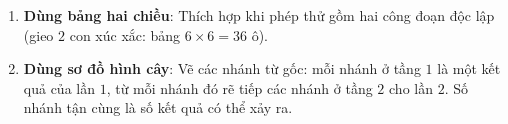\begin{enumerate}
\item \textbf{Dùng bảng hai chiều}: Thích hợp khi phép thử gồm hai công đoạn độc lập (gieo $2$ con xúc xắc: bảng $6 \times 6 = 36$ ô).
\item \textbf{Dùng sơ đồ hình cây}: Vẽ các nhánh từ gốc: mỗi nhánh ở tầng $1$ là một kết quả của lần $1$, từ mỗi nhánh đó rẽ tiếp các nhánh ở tầng $2$ cho lần $2$. Số nhánh tận cùng là số kết quả có thể xảy ra.
\end{enumerate}
